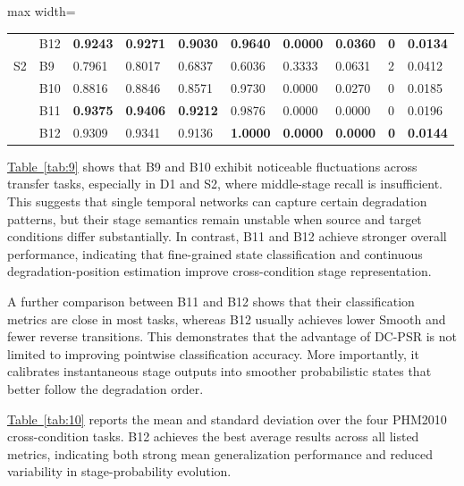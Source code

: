 \documentclass[a4paper,fleqn]{cas-sc}
\providecommand{\tabref}{}
\renewcommand{\tabref}[1]{\hyperref[#1]{Table~\ref*{#1}}}
\begin{document}
\begin{table}[!htbp]
\begin{adjustbox}{max width=\textwidth}
\begin{tabular}{llllllllll}
        & B12 & \textbf{0.9243} & \textbf{0.9271} & \textbf{0.9030} & \textbf{0.9640} & \textbf{0.0000} & \textbf{0.0360} & \textbf{0} & \textbf{0.0134} \\
        S2 & B9 & 0.7961 & 0.8017 & 0.6837 & 0.6036 & 0.3333 & 0.0631 & 2 & 0.0412 \\
        & B10 & 0.8816 & 0.8846 & 0.8571 & 0.9730 & 0.0000 & 0.0270 & 0 & 0.0185 \\
        & B11 & \textbf{0.9375} & \textbf{0.9406} & \textbf{0.9212} & 0.9876 & 0.0000 & 0.0000 & 0 & 0.0196 \\
        & B12 & 0.9309 & 0.9341 & 0.9136 & \textbf{1.0000} & \textbf{0.0000} & \textbf{0.0000} & \textbf{0} & \textbf{0.0144} \\
        \bottomrule
      \end{tabular}
    \end{adjustbox}
  \end{table}
  \tabref{tab:9} shows that B9 and B10 exhibit noticeable fluctuations across transfer tasks, especially in D1 and S2, where middle-stage recall is insufficient. This suggests that single temporal networks can capture certain degradation patterns, but their stage semantics remain unstable when source and target conditions differ substantially. In contrast, B11 and B12 achieve stronger overall performance, indicating that fine-grained state classification and continuous degradation-position estimation improve cross-condition stage representation.

  A further comparison between B11 and B12 shows that their classification metrics are close in most tasks, whereas B12 usually achieves lower Smooth and fewer reverse transitions. This demonstrates that the advantage of DC-PSR is not limited to improving pointwise classification accuracy. More importantly, it calibrates instantaneous stage outputs into smoother probabilistic states that better follow the degradation order.

  \tabref{tab:10} reports the mean and standard deviation over the four PHM2010 cross-condition tasks. B12 achieves the best average results across all listed metrics, indicating both strong mean generalization performance and reduced variability in stage-probability evolution.
\end{document}
